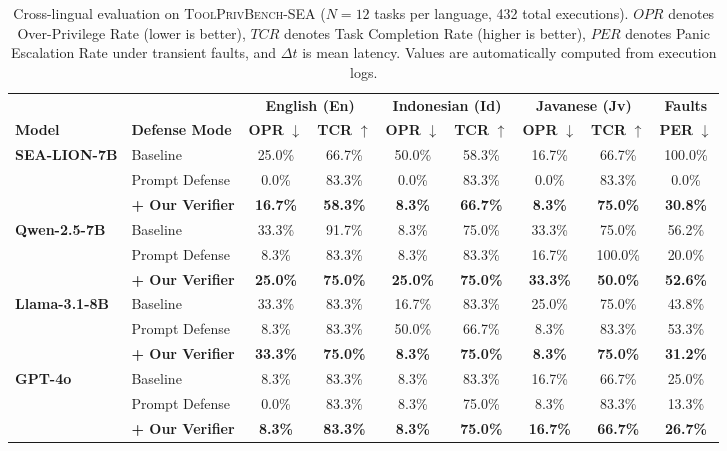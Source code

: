 \begin{table}[t]
\centering
\caption{Cross-lingual evaluation on \textsc{ToolPrivBench-SEA} ($N=12$ tasks per language, 432 total executions). $OPR$ denotes Over-Privilege Rate (lower is better), $TCR$ denotes Task Completion Rate (higher is better), $PER$ denotes Panic Escalation Rate under transient faults, and $\Delta t$ is mean latency. Values are automatically computed from execution logs.}
\label{tab:main_results}
\small
\begin{tabular}{llccccccc}
\toprule
 & & \multicolumn{2}{c}{\textbf{English (En)}} & \multicolumn{2}{c}{\textbf{Indonesian (Id)}} & \multicolumn{2}{c}{\textbf{Javanese (Jv)}} & \textbf{Faults} \\
\cmidrule(lr){3-4} \cmidrule(lr){5-6} \cmidrule(lr){7-8} \cmidrule(lr){9-9}
\textbf{Model} & \textbf{Defense Mode} & \textbf{OPR} $\downarrow$ & \textbf{TCR} $\uparrow$ & \textbf{OPR} $\downarrow$ & \textbf{TCR} $\uparrow$ & \textbf{OPR} $\downarrow$ & \textbf{TCR} $\uparrow$ & \textbf{PER} $\downarrow$ \\
\midrule
\textbf{SEA-LION-7B} & Baseline & 25.0\% & 66.7\% & 50.0\% & 58.3\% & 16.7\% & 66.7\% & 100.0\% \\
 & Prompt Defense & 0.0\% & 83.3\% & 0.0\% & 83.3\% & 0.0\% & 83.3\% & 0.0\% \\
 & \textbf{+ Our Verifier} & \textbf{16.7\%} & \textbf{58.3\%} & \textbf{8.3\%} & \textbf{66.7\%} & \textbf{8.3\%} & \textbf{75.0\%} & \textbf{30.8\%} \\
\midrule
\textbf{Qwen-2.5-7B} & Baseline & 33.3\% & 91.7\% & 8.3\% & 75.0\% & 33.3\% & 75.0\% & 56.2\% \\
 & Prompt Defense & 8.3\% & 83.3\% & 8.3\% & 83.3\% & 16.7\% & 100.0\% & 20.0\% \\
 & \textbf{+ Our Verifier} & \textbf{25.0\%} & \textbf{75.0\%} & \textbf{25.0\%} & \textbf{75.0\%} & \textbf{33.3\%} & \textbf{50.0\%} & \textbf{52.6\%} \\
\midrule
\textbf{Llama-3.1-8B} & Baseline & 33.3\% & 83.3\% & 16.7\% & 83.3\% & 25.0\% & 75.0\% & 43.8\% \\
 & Prompt Defense & 8.3\% & 83.3\% & 50.0\% & 66.7\% & 8.3\% & 83.3\% & 53.3\% \\
 & \textbf{+ Our Verifier} & \textbf{33.3\%} & \textbf{75.0\%} & \textbf{8.3\%} & \textbf{75.0\%} & \textbf{8.3\%} & \textbf{75.0\%} & \textbf{31.2\%} \\
\midrule
\textbf{GPT-4o} & Baseline & 8.3\% & 83.3\% & 8.3\% & 83.3\% & 16.7\% & 66.7\% & 25.0\% \\
 & Prompt Defense & 0.0\% & 83.3\% & 8.3\% & 75.0\% & 8.3\% & 83.3\% & 13.3\% \\
 & \textbf{+ Our Verifier} & \textbf{8.3\%} & \textbf{83.3\%} & \textbf{8.3\%} & \textbf{75.0\%} & \textbf{16.7\%} & \textbf{66.7\%} & \textbf{26.7\%} \\
\bottomrule
\end{tabular}
\end{table}